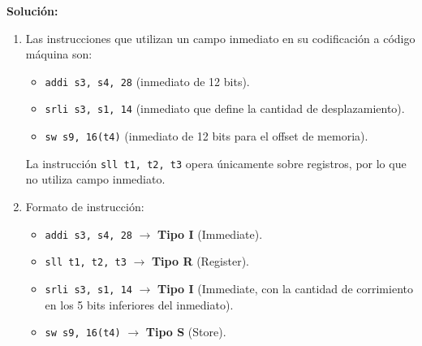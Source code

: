 \documentclass[letterpaper,12pt]{article}
\begin{document}
\begin{enumerate}
    \color{solcolor}
    \textbf{Solución:}
    \begin{enumerate}[label=\alph*)]
        \item Las instrucciones que utilizan un campo inmediato en su codificación a código máquina son:
        \begin{itemize}[noitemsep]
            \item \texttt{addi s3, s4, 28} (inmediato de 12 bits).
            \item \texttt{srli s3, s1, 14} (inmediato que define la cantidad de desplazamiento).
            \item \texttt{sw s9, 16(t4)} (inmediato de 12 bits para el offset de memoria).
        \end{itemize}
        La instrucción \texttt{sll t1, t2, t3} opera únicamente sobre registros, por lo que no utiliza campo inmediato.
        
        \item Formato de instrucción:
        \begin{itemize}[noitemsep]
            \item \texttt{addi s3, s4, 28} $\rightarrow$ \textbf{Tipo I} (Immediate).
            \item \texttt{sll t1, t2, t3} $\rightarrow$ \textbf{Tipo R} (Register).
            \item \texttt{srli s3, s1, 14} $\rightarrow$ \textbf{Tipo I} (Immediate, con la cantidad de corrimiento en los 5 bits inferiores del inmediato).
            \item \texttt{sw s9, 16(t4)} $\rightarrow$ \textbf{Tipo S} (Store).
        \end{itemize}
        

\end{enumerate}
\end{enumerate}
\end{document}
